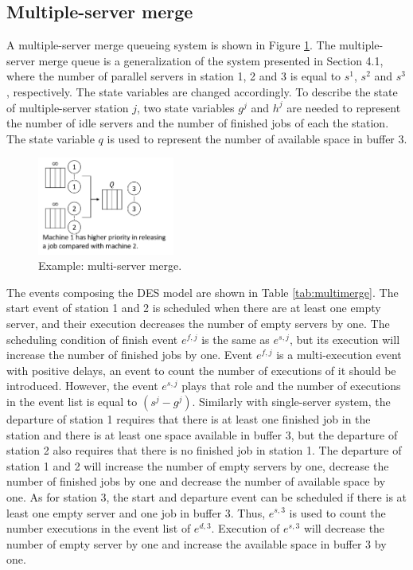 \documentclass[]{interact}
\theoremstyle{plain}%
\theoremstyle{definition}
\theoremstyle{remark}
\begin{document}
\subsection{Multiple-server merge}
A multiple-server merge queueing system is shown in Figure \ref{fig:multimerge}. The multiple-server merge queue is a generalization of the system presented in Section 4.1, where the number of parallel servers in station 1, 2 and 3 is equal to $s^1$, $s^2$ and $s^3$, respectively. The state variables are changed accordingly. To describe the state of multiple-server station $j$, two state variables $g^{j}$ and $h^{j}$ are needed to represent the number of idle servers and the number of finished jobs of each the station. The state variable $q$ is used to represent the number of available space in buffer 3. 

\begin{figure}[h]
	\centering
	\includegraphics[width=0.4\textwidth]{Figures/multimerge.png}
	\caption{Example: multi-server merge.}
	\label{fig:multimerge}
\end{figure}


The events composing the DES model are shown in Table \ref{tab:multimerge}. The start event of station 1 and 2 is scheduled when there are at least one empty server, and their execution decreases the number of empty servers by one. The scheduling condition of finish event $e^{f,j}$ is the same as $e^{s,j}$, but its execution will increase the number of finished jobs by one. Event $e^{f,j}$ is a multi-execution event with positive delays, an event to count the number of executions of it should be introduced. However, the event $e^{s,j}$ plays that role and the number of executions in the event list is equal to $(s^j-g^j)$. Similarly with single-server system, the departure of station 1 requires that there is at least one finished job in the station and there is at least one space available in buffer 3, but the departure of station 2 also requires that there is no finished job in station 1. The departure of station 1 and 2 will increase the number of empty servers by one, decrease the number of finished jobs by one and decrease the number of available space by one. As for station 3, the start and departure event can be scheduled if there is at least one empty server and one job in buffer 3. Thus, $e^{s,3}$ is used to count the number executions in the event list of $e^{d,3}$. Execution of $e^{s,3}$ will decrease the number of empty server by one and increase the available space in buffer 3 by one.
\end{document}
